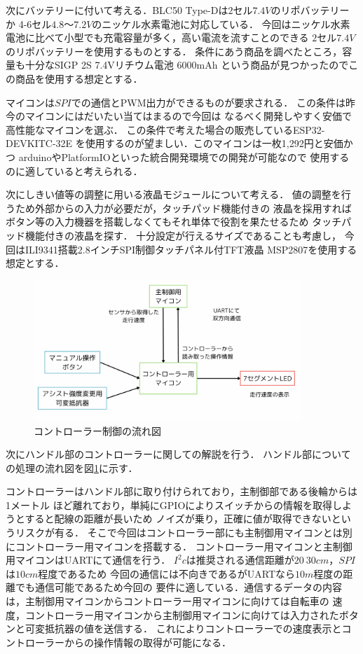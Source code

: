 \documentclass[uplatex,dvipdfmx]{jsarticle}
\begin{document}
次にバッテリーに付いて考える．BLC50 Type-Dは$2$セル$7.4V$のリポバッテリーか
4-6セル$4.8〜7.2V$のニッケル水素電池に対応している．
今回はニッケル水素電池に比べて小型でも充電容量が多く，高い電流を流すことのできる
$2$セル$7.4V$のリポバッテリーを使用するものとする．
条件にあう商品を調べたところ，容量も十分なSIGP 2S 7.4Vリチウム電池 6000mAh
という商品が見つかったのでこの商品を使用する想定とする\cite{lipo}．

マイコンは$SPI$での通信とPWM出力ができるものが要求される．
この条件は昨今のマイコンにはだいたい当てはまるので今回は
なるべく開発しやすく安価で高性能なマイコンを選ぶ．
この条件で考えた場合の販売しているESP32-DEVKITC-32E
を使用するのが望ましい\cite{maikon}．このマイコンは一枚1,292円と安価かつ
arduinoやPlatformIOといった統合開発環境での開発が可能なので
使用するのに適していると考えられる．

次にしきい値等の調整に用いる液晶モジュールについて考える．
値の調整を行うため外部からの入力が必要だが，タッチパッド機能付きの
液晶を採用すればボタン等の入力機器を搭載しなくてもそれ単体で役割を果たせるため
タッチパッド機能付きの液晶を探す．
十分設定が行えるサイズであることも考慮し，
今回はILI9341搭載2.8インチSPI制御タッチパネル付TFT液晶 MSP2807を使用する想定とする\cite{ekisyou}．


\begin{figure}[H]
    \centering
    \includegraphics[width=0.9\textwidth]{fig/nagare_conto.png}
    \caption{コントローラー制御の流れ図}
    \label{fig:nagare_conto}
\end{figure}
次にハンドル部のコントローラーに関しての解説を行う．
ハンドル部についての処理の流れ図を図\ref{fig:nagare_conto}に示す．

コントローラーはハンドル部に取り付けられており，主制御部である後輪からは1メートル
ほど離れており，単純にGPIOによりスイッチからの情報を取得しようとすると配線の距離が長いため
ノイズが乗り，正確に値が取得できないというリスクが有る．
そこで今回はコントローラー部にも主制御用マイコンとは別にコントローラー用マイコンを搭載する．
コントローラー用マイコンと主制御用マイコンはUARTにて通信を行う．
$I^2c$は推奨される通信距離が$20~30cm$，$SPI$は$10cm$程度であるため
今回の通信には不向きであるがUARTなら$10m$程度の距離でも通信可能であるため今回の
要件に適している．通信するデータの内容は，主制御用マイコンからコントローラー用マイコンに向けては自転車の
速度，コントローラー用マイコンから主制御用マイコンに向けては入力されたボタンと可変抵抗器の値を送信する．
これによりコントローラーでの速度表示とコントローラーからの操作情報の取得が可能になる．
\end{document}
